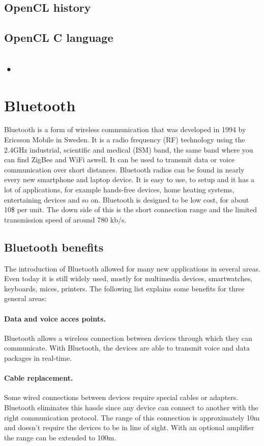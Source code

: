 \documentclass[a4paper, 11pt]{report}
\begin{document}
	\subsection{OpenCL history}


	\subsection{OpenCL C language}
	
	\subsection{•}

	
\section{Bluetooth}
Bluetooth is a form of wireless communication that was developed in 1994 by Ericsson Mobile in Sweden. It is a radio frequency (RF) technology using the 2.4GHz industrial, scientific and medical (ISM) band, the same band where you can find ZigBee and WiFi aswell. It can be used to transmit data or voice communication over short distances. Bluetooth radios can be found in nearly every new smartphone and laptop device. It is easy to use, to setup and it has a lot of applications, for example hands-free devices, home heating systems, entertaining devices and so on. Bluetooth is designed to be low cost, for about 10\$ per unit. The down side of this is the short connection range and the limited transmission speed of around 780 kb/s\cite{bluetoothTech}.\\

	\subsection{Bluetooth benefits}
The introduction of Bluetooth allowed for many new applications in several areas. Even today it is still widely used, mostly for multimedia devices, smartwatches, keyboards, mices, printers. The following list explains some benefits for three general areas:
		\paragraph{Data and voice acces points.}
Bluetooth allows a wireless connection between devices through which they can communicate. With Bluetooth, the devices are able to transmit voice and data packages in real-time.
		\paragraph{Cable replacement.}
Some wired connections between devices require special cables or adapters. Bluetooth eliminates this hassle since any device can connect to another with the right communication protocol. The range of this connection is approximately 10m and doesn't require the devices to be in line of sight. With an optional amplifier the range can be extended to 100m.
\end{document}
